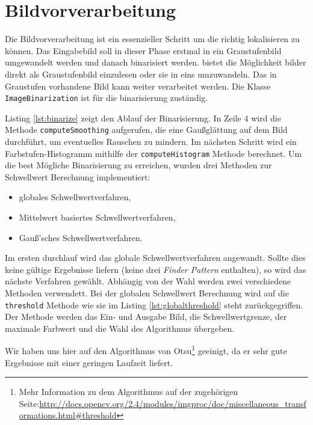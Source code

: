 \chapter{Bildvorverarbeitung}
Die Bildvorverarbeitung ist ein essenzieller Schritt um die \QRCodes richtig lokalisieren zu können. Das Eingabebild soll in dieser Phase erstmal in ein Graustufenbild umgewandelt werden und danach binarisiert werden. \OpenCV bietet die Möglichkeit bilder direkt als Graustufenbild einzulesen oder sie in eins umzuwandeln. Das in Graustufen vorhandene Bild kann weiter verarbeitet werden.
Die Klasse \texttt{ImageBinarization} ist für die binarisierung zuständig. 

Listing \ref{lst:binarize} zeigt den Ablauf der Binarisierung. In Zeile 4 wird die Methode \texttt{computeSmoothing} aufgerufen, die eine Gaußglättung auf dem Bild durchführt, um eventuelles Rauschen zu mindern. Im nächsten Schritt wird ein Farbstufen-Histogramm mithilfe der \texttt{computeHistogram} Methode berechnet. Um die best Mögliche Binarisierung zu erreichen, wurden drei Methoden zur Schwellwert Berechnung implementiert:
\begin{itemize}
	\item globales Schwellwertverfahren,
	\item Mittelwert basiertes Schwellwertverfahren,
	\item Gauß'sches Schwellwertverfahren.
\end{itemize} 
Im ersten durchlauf wird das globale Schwellwertverfahren angewandt. Sollte dies keine gültige Ergebnisse liefern (keine drei \emph{Finder Pattern} enthalten), so wird das nächste Verfahren gewählt.
Abhängig von der Wahl werden zwei verschiedene \OpenCV Methoden verwendett. Bei der globalen Schwellwert Berechnung wird auf die \texttt{threshold} Methode wie sie im Listing \ref{lst:globalthreshold} steht zurückgegriffen. Der Methode werden das Ein- und Ausgabe Bild, die Schwellwertgrenze, der maximale Farbwert und die Wahl des Algorithmus übergeben. 

Wir haben uns hier auf den Algorithmus von Otsu\footnote{Mehr Information zu dem Algorithmus auf der zugehörigen \OpenCV Seite:\url{http://docs.opencv.org/2.4/modules/imgproc/doc/miscellaneous_transformations.html\#threshold}} geeinigt, da er sehr gute Ergebnisse mit einer geringen Laufzeit liefert.


